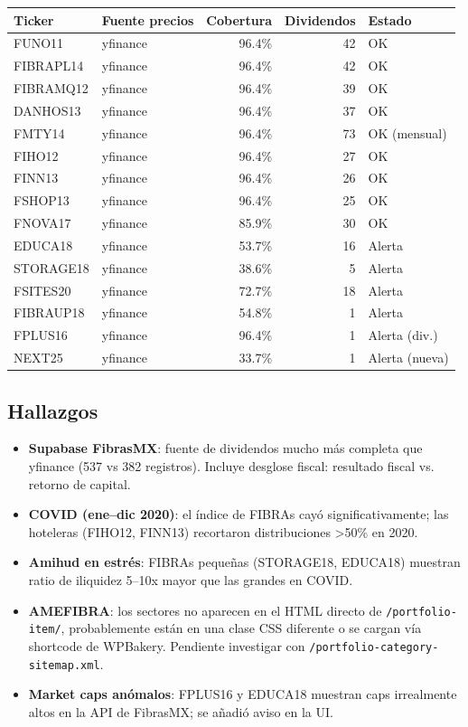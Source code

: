 \documentclass[12pt, a4paper]{article}
\begin{document}
\begin{center}
\begin{tabular}{llrrl}
  \toprule
  \textbf{Ticker} & \textbf{Fuente precios} & \textbf{Cobertura} & \textbf{Dividendos} & \textbf{Estado} \\
  \midrule
  FUNO11    & yfinance & 96.4\% & 42 & OK \\
  FIBRAPL14 & yfinance & 96.4\% & 42 & OK \\
  FIBRAMQ12 & yfinance & 96.4\% & 39 & OK \\
  DANHOS13  & yfinance & 96.4\% & 37 & OK \\
  FMTY14    & yfinance & 96.4\% & 73 & OK (mensual) \\
  FIHO12    & yfinance & 96.4\% & 27 & OK \\
  FINN13    & yfinance & 96.4\% & 26 & OK \\
  FSHOP13   & yfinance & 96.4\% & 25 & OK \\
  FNOVA17   & yfinance & 85.9\% & 30 & OK \\
  EDUCA18   & yfinance & 53.7\% & 16 & Alerta \\
  STORAGE18 & yfinance & 38.6\% & 5  & Alerta \\
  FSITES20  & yfinance & 72.7\% & 18 & Alerta \\
  FIBRAUP18 & yfinance & 54.8\% & 1  & Alerta \\
  FPLUS16   & yfinance & 96.4\% & 1  & Alerta (div.) \\
  NEXT25    & yfinance & 33.7\% & 1  & Alerta (nueva) \\
  \bottomrule
\end{tabular}
\end{center}

\subsection{Hallazgos}
\begin{itemize}
  \item \textbf{Supabase FibrasMX}: fuente de dividendos mucho m\'{a}s completa que yfinance
        (537 vs 382 registros). Incluye desglose fiscal: resultado fiscal vs. retorno de capital.
  \item \textbf{COVID (ene--dic 2020)}: el \'{i}ndice de FIBRAs cay\'{o} significativamente;
        las hoteleras (FIHO12, FINN13) recortaron distribuciones >50\% en 2020.
  \item \textbf{Amihud en estr\'{e}s}: FIBRAs peque\~{n}as (STORAGE18, EDUCA18) muestran
        ratio de iliquidez 5--10x mayor que las grandes en COVID.
  \item \textbf{AMEFIBRA}: los sectores no aparecen en el HTML directo de \texttt{/portfolio-item/},
        probablemente est\'{a}n en una clase CSS diferente o se cargan v\'{i}a shortcode de WPBakery.
        Pendiente investigar con \texttt{/portfolio-category-sitemap.xml}.
  \item \textbf{Market caps an\'{o}malos}: FPLUS16 y EDUCA18 muestran caps irrealmente altos en
        la API de FibrasMX; se a\~{n}adi\'{o} aviso en la UI.
\end{itemize}
\end{document}
